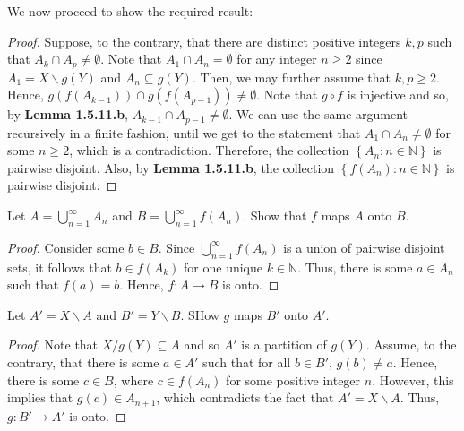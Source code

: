 \documentclass[12pt]{article}
\newcommand{\N}{\mathbb{N}}
\newenvironment{problem}[2][Problem]{\begin{trivlist}
		\item[\hskip \labelsep {\bfseries #1}\hskip \labelsep {\bfseries #2.}]}{\end{trivlist}}
\newenvironment{solution}[2][Solution]{\begin{trivlist}
		\item[\hskip \labelsep {\bfseries #1}\hskip \labelsep {\bfseries #2.}]}{\end{trivlist}}
\begin{document}
\begin{problem}{1.5.11 (Schr\"oder-Bernstein Theorem).}
\begin{enumerate}
\begin{solution}{(b)}
       We now proceed to show the required result:
      \begin{proof}
	Suppose, to the contrary, that there are distinct positive integers $k,p$ such that $A_{k}\cap A_{p}\neq \emptyset$. Note that $A_{1}\cap A_{n}=\emptyset$ for any integer $n\geq 2$ since $A_{1}=X\backslash g(Y)$ and $A_{n}\subseteq g(Y)$. Then, we may further assume that $k,p\geq 2$. Hence, $g\left( f\left( A_{k-1} \right) \right)\cap g\left(f \left( A_{p-1} \right) \right) \neq \emptyset$. Note that $g\circ f$ is injective and so, by \textbf{Lemma 1.5.11.b}, $A_{k-1}\cap A_{p-1}\neq \emptyset$. We can use the same argument recursively in a finite fashion, until we get to the statement that $A_{1}\cap A_{n}\neq \emptyset$ for some $n\geq 2$, which is a contradiction. Therefore, the collection $\left\{ A_{n}:n\in\N \right\}$ is pairwise disjoint.
	Also, by \textbf{Lemma 1.5.11.b},  the collection $\left\{ f(A_{n}):n\in\N \right\}$ is pairwise disjoint.
      \end{proof}
     \end{solution}
    \item Let $A=\bigcup_{n=1}^{\infty} A_{n}$ and $B=\bigcup_{n=1}^{\infty}f(A_{n})$. Show that $f$ maps $A$ onto $B$.
      \begin{proof}
	Consider some $b\in B$. Since $\bigcup_{n=1}^{\infty}f(A_{n})$ is a union of pairwise disjoint sets, it follows that $b\in f(A_{k})$ for one unique $k\in \N$. Thus, there is some $a\in A_{n}$ such that $f(a)=b$. Hence, $f:A\to B$ is onto. 
      \end{proof}
    \item Let $A'=X\backslash A$ and $B' = Y\backslash B$. SHow $g$ maps $B'$ onto $A'$.
      \begin{proof}
	Note that $X/g(Y) \subseteq A$ and so $A'$ is a partition of $g(Y)$. Assume, to the contrary, that there is some $a\in A'$ such that for all $b\in B'$, $g(b)\neq a$. Hence, there is some  $c\in B$, where $c\in f(A_{n})$ for some positive integer $n$. However, this implies that $g(c)\in A_{n+1}$, which contradicts the fact that $A'=X\backslash A$. Thus, $g:B'\to A'$ is onto.  
      \end{proof}
  \end{enumerate}
\end{problem}
\end{document}
